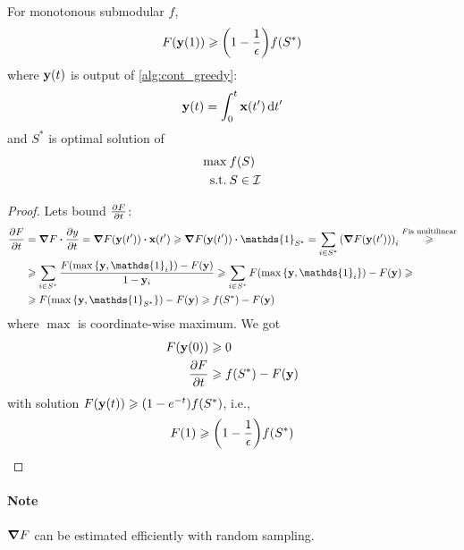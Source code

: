 \begin{theorem}
	For monotonous submodular $f$,
	\begin{align}
	F(\vb{y}(1)) \geqslant \qty(1-\frac{1}{\epsilon})f(S^*)
	\end{align}
	where $\vb{y}(t)$ is output of \vref{alg:cont_greedy}:
	\begin{align}
	\vb{y}(t) = \int_0^t \vb{x}(t') \dd{t'}
	\end{align}
	and $S^*$ is optimal solution of
	\begin{align}
	\max \: & f(S)\\
	\text{s.t.} \: & S\in \mathcal{I}
	\end{align}
	\begin{proof}
		Lets bound $\pdv{F}{t} (\vb{y}(t'))$:
		\begin{align}
		\pdv{F}{t} (\vb{y}(t')) &=  \grad{F} \vdot \pdv{y}{t} =  \grad{F\qty(\vb{y}(t'))} \vdot \vb{x}(t') \geqslant \grad{F\qty(\vb{y}(t'))} \vdot \mathds{1}_{S^*}= \sum_{i \in S^*} \qty(\grad{F\qty(\vb{y}(t'))})_i \stackrel{F \text{is multilinear}}{\geqslant}\\&\geqslant \sum_{i \in S^*} \frac{F\qty(\max\qty{\vb{y}, \mathds{1}_i})-F(\vb{y})}{1-\vb{y}_i} \geqslant \sum_{i \in S^*} F\qty(\max\qty{\vb{y}, \mathds{1}_i})-F(\vb{y}) \geqslant\\&\geqslant F\qty(\max\qty{\vb{y}, \mathds{1}_{S^*}})-F(\vb{y}) \geqslant f(S^*)-F(\vb{y})
		\end{align}
		where $\max$ is coordinate-wise maximum.
		We got
		\begin{align}
			F(\vb{y}(0)) &\geqslant 0 \\
			\pdv{F}{t} &\geqslant f(S^*) - F(\vb{y})
		\end{align}
		with solution $F(\vb{y}(t)) \geqslant \qty(1-e^{-t}) f(S^*)$, i.e., 
		\begin{align}
		F(1) \geqslant \qty(1-\frac{1}{\epsilon})f(S^*)
		\end{align}
	\end{proof}
\end{theorem}
\paragraph{Note} $\grad F$ can be estimated efficiently with random sampling.